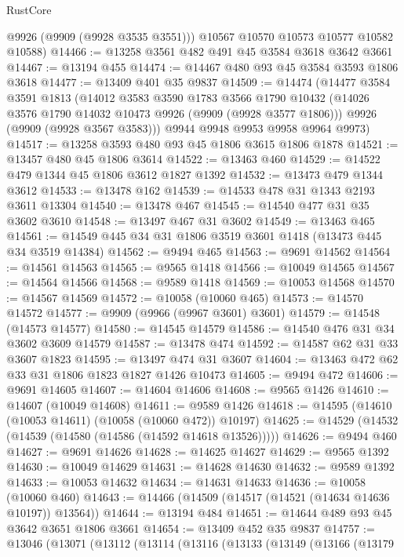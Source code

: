 \begin{lexlean}{RustCore}
\begin{coremodule}
        @9926
        (@9909 (@9928 @3535 @3551)))
      @10567
      @10570
      @10573
      @10577
      @10582
      @10588)
@14466 := @13258 @3561 @482 @491 @45 @3584 @3618 @3642 @3661
@14467 := @13194 @455
@14474 := @14467 @480 @93 @45 @3584 @3593 @1806 @3618
@14477 := @13409 @401 @35 @9837
@14509 := @14474
    (@14477
      @3584
      @3591
      @1813
      (@14012
        @3583
        @3590
        @1783
        @3566
        @1790
        @10432
        (@14026 @3576 @1790 @14032 @10473 @9926 (@9909 (@9928 @3577 @1806)))
        @9926
        (@9909 (@9928 @3567 @3583)))
      @9944
      @9948
      @9953
      @9958
      @9964
      @9973)
@14517 := @13258 @3593 @480 @93 @45 @1806 @3615 @1806 @1878
@14521 := @13457 @480 @45 @1806 @3614
@14522 := @13463 @460
@14529 := @14522 @479 @1344 @45 @1806 @3612 @1827 @1392
@14532 := @13473 @479 @1344 @3612
@14533 := @13478 @162
@14539 := @14533 @478 @31 @1343 @2193 @3611 @13304
@14540 := @13478 @467
@14545 := @14540 @477 @31 @35 @3602 @3610
@14548 := @13497 @467 @31 @3602
@14549 := @13463 @465
@14561 := @14549 @445 @34 @31 @1806 @3519 @3601 @1418 (@13473 @445 @34 @3519 @14384)
@14562 := @9494 @465
@14563 := @9691 @14562
@14564 := @14561 @14563
@14565 := @9565 @1418
@14566 := @10049 @14565
@14567 := @14564 @14566
@14568 := @9589 @1418
@14569 := @10053 @14568
@14570 := @14567 @14569
@14572 := @10058 (@10060 @465)
@14573 := @14570 @14572
@14577 := @9909 (@9966 (@9967 @3601) @3601)
@14579 := @14548 (@14573 @14577)
@14580 := @14545 @14579
@14586 := @14540 @476 @31 @34 @3602 @3609 @14579
@14587 := @13478 @474
@14592 := @14587 @62 @31 @33 @3607 @1823
@14595 := @13497 @474 @31 @3607
@14604 := @13463 @472 @62 @33 @31 @1806 @1823 @1827 @1426 @10473
@14605 := @9494 @472
@14606 := @9691 @14605
@14607 := @14604 @14606
@14608 := @9565 @1426
@14610 := @14607 (@10049 @14608)
@14611 := @9589 @1426
@14618 := @14595 (@14610 (@10053 @14611) (@10058 (@10060 @472)) @10197)
@14625 := @14529 (@14532 (@14539 (@14580 (@14586 (@14592 @14618 @13526)))))
@14626 := @9494 @460
@14627 := @9691 @14626
@14628 := @14625 @14627
@14629 := @9565 @1392
@14630 := @10049 @14629
@14631 := @14628 @14630
@14632 := @9589 @1392
@14633 := @10053 @14632
@14634 := @14631 @14633
@14636 := @10058 (@10060 @460)
@14643 := @14466 (@14509 (@14517 (@14521 (@14634 @14636 @10197)) @13564))
@14644 := @13194 @484
@14651 := @14644 @489 @93 @45 @3642 @3651 @1806 @3661
@14654 := @13409 @452 @35 @9837
@14757 := @13046
    (@13071
      (@13112
        (@13114
          (@13116
            (@13133
              (@13149
                (@13166
                  (@13179

\end{coremodule}
\end{lexlean}
